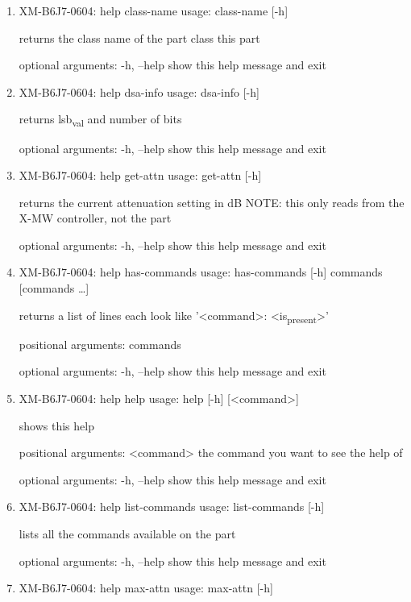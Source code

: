 \documentclass[11pt]{article}
\begin{document}
\begin{enumerate}
\item XM-B6J7-0604: help class-name
\label{sec:org04e9021}
usage: class-name [-h]

returns the class name of the part class this part

optional arguments:
  -h, --help  show this help message and exit

\item XM-B6J7-0604: help dsa-info
\label{sec:org0f6b825}
usage: dsa-info [-h]

returns lsb\textsubscript{val} and number of bits

optional arguments:
  -h, --help  show this help message and exit

\item XM-B6J7-0604: help get-attn
\label{sec:org37d97f3}
usage: get-attn [-h]

returns the current attenuation setting in dB NOTE: this only reads from the
X-MW controller, not the part

optional arguments:
  -h, --help  show this help message and exit

\item XM-B6J7-0604: help has-commands
\label{sec:org5518d83}
usage: has-commands [-h] commands [commands \ldots{}]

returns a list of lines each look like '<command>: <is\textsubscript{present}>'

positional arguments:
  commands

optional arguments:
  -h, --help  show this help message and exit

\item XM-B6J7-0604: help help
\label{sec:org9c73cd1}
usage: help [-h] [<command>]

shows this help

positional arguments:
  <command>   the command you want to see the help of

optional arguments:
  -h, --help  show this help message and exit

\item XM-B6J7-0604: help list-commands
\label{sec:org982cc3f}
usage: list-commands [-h]

lists all the commands available on the part

optional arguments:
  -h, --help  show this help message and exit

\item XM-B6J7-0604: help max-attn
\label{sec:org0a8b685}
usage: max-attn [-h]


\end{enumerate}
\end{document}
